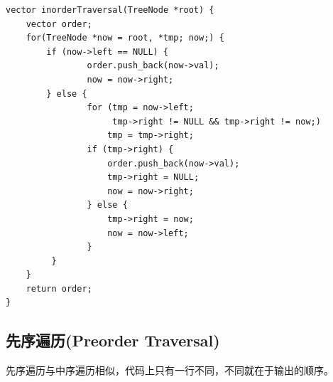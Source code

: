 \documentclass[12pt]{book}
\begin{document}
\begin{enumerate}
\lstset{language=java,label= ,caption= ,numbers=none}
\begin{lstlisting}
vector inorderTraversal(TreeNode *root) {
    vector order;
    for(TreeNode *now = root, *tmp; now;) {
        if (now->left == NULL) {
                order.push_back(now->val);
                now = now->right;   
        } else {		
                for (tmp = now->left;
                     tmp->right != NULL && tmp->right != now;) 
                    tmp = tmp->right;
                if (tmp->right) {
                    order.push_back(now->val);
                    tmp->right = NULL;
                    now = now->right;
                } else {
                    tmp->right = now;
                    now = now->left;
                }
         }
    }
    return order;
}
\end{lstlisting}
\end{enumerate}

\subsection{先序遍历(Preorder Traversal)}
\label{sec-4-1-2}
先序遍历与中序遍历相似，代码上只有一行不同，不同就在于输出的顺序。
\end{document}
